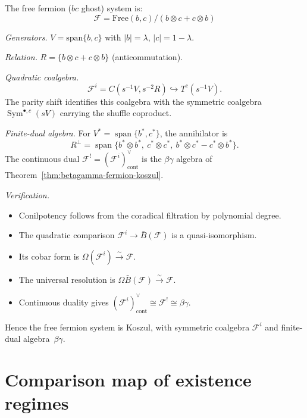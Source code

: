 \begin{example}\label{ex:free-fermion-koszul-dual}
The free fermion ($bc$ ghost) system is:
\[\mathcal{F} = \text{Free}(b, c) / (b \otimes c + c \otimes b)\]

\emph{Generators.} $V = \text{span}\{b, c\}$ with $|b| = \lambda$,
$|c| = 1 - \lambda$.

\emph{Relation.} $R = \{b \otimes c + c \otimes b\}$ (anticommutation).

\emph{Quadratic coalgebra.}
\[
 \mathcal F^i=C(s^{-1}V,s^{-2}R)\hookrightarrow T^c(s^{-1}V).
\]
The parity shift identifies this coalgebra with the symmetric coalgebra
$\operatorname{Sym}^{\bullet,c}(sV)$ carrying the shuffle coproduct.

\emph{Finite-dual algebra.}
For $V^*=\operatorname{span}\{b^*,c^*\}$, the annihilator is
\[
 R^\perp=\operatorname{span}\{
 b^*\otimes b^*,\ c^*\otimes c^*,\
 b^*\otimes c^*-c^*\otimes b^*\}.
\]
The continuous dual
$\mathcal F^!=(\mathcal F^i)^\vee_{\mathrm{cont}}$ is the
$\beta\gamma$ algebra of
Theorem~\ref{thm:betagamma-fermion-koszul}.

\emph{Verification.}
\begin{itemize}
\item Conilpotency follows from the coradical filtration by polynomial degree.
\item The quadratic comparison
 $\mathcal F^i\to\bar B(\mathcal F)$ is a quasi-isomorphism.
\item Its cobar form is
 $\Omega(\mathcal F^i)\xrightarrow{\sim}\mathcal F$.
\item The universal resolution is
 $\Omega\bar B(\mathcal F)\xrightarrow{\sim}\mathcal F$.
\item Continuous duality gives
 $(\mathcal F^i)^\vee_{\mathrm{cont}}\cong\mathcal F^!\cong\beta\gamma$.
\end{itemize}

Hence the free fermion system is Koszul, with symmetric coalgebra
$\mathcal F^i$ and finite-dual algebra~$\beta\gamma$.
\end{example}


\section{Comparison map of existence regimes}
\label{sec:existence-summary}

